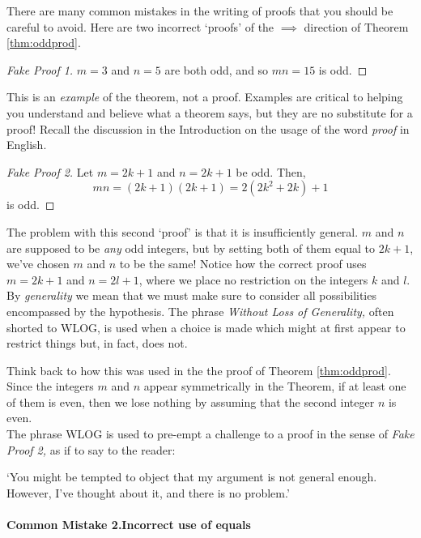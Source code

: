 There are many common mistakes in the writing of proofs that you should be careful to avoid. Here are two incorrect `proofs' of the $\implies$ direction of Theorem \ref{thm:oddprod}.

\begin{proof}[Fake Proof 1]
$m=3$ and $n=5$ are both odd, and so $mn=15$ is odd.
\end{proof}

 This is an \emph{example} of the theorem, not a proof. Examples are critical to helping you understand and believe what a theorem says, but they are no substitute for a proof! Recall the discussion in the Introduction on the usage of the word \emph{proof} in English.

\begin{proof}[Fake Proof 2]
Let $m=2k+1$ and $n=2k+1$ be odd. Then,
\[mn=(2k+1)(2k+1)=2(2k^2+2k)+1\]
is odd.
\end{proof}

 The problem with this second `proof' is that it is insufficiently general. $m$ and $n$ are supposed to be \emph{any} odd integers, but by setting both of them equal to $2k+1$, we've chosen $m$ and $n$ to be the same! Notice how the correct proof uses $m=2k+1$ and $n=2l+1$, where we place no restriction on the integers $k$ and $l$.\\


 By \emph{generality} we mean that we must make sure to consider all possibilities encompassed by the hypothesis. The phrase \emph{Without Loss of Generality,} often shorted to WLOG, is used when a choice is made which might at first appear to restrict things but, in fact, does not.

Think back to how this was used in the the proof of Theorem \ref{thm:oddprod}. Since the integers $m$ and $n$ appear symmetrically in the Theorem, if at least one of them is even, then we lose nothing by assuming that the second integer $n$ is even.\\

The phrase WLOG is used to pre-empt a challenge to a proof in the sense of \emph{Fake Proof 2,} as if to say to the reader:
\begin{center}
`You might be tempted to object that my argument is not general enough. However, I've thought about it, and there is no problem.'\\
\end{center}

\paragraph{Common Mistake 2.\quad Incorrect use of equals}

